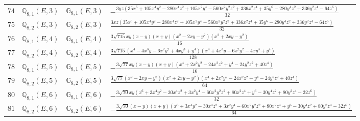\documentclass[fleqn,8pt,landscape]{jsarticle}
\begin{document}
\begin{table}[ht!]
\begin{center}
\begin{tabular}{cccl}
$ 74 $ & $ \mathbb{Q}_{8,1}(E,3) $ & $ \mathbb{G}_{8,1}(E,3) $ & $ - \frac{3 y z \left(35 x^{6} + 105 x^{4} y^{2} - 280 x^{4} z^{2} + 105 x^{2} y^{4} - 560 x^{2} y^{2} z^{2} + 336 x^{2} z^{4} + 35 y^{6} - 280 y^{4} z^{2} + 336 y^{2} z^{4} - 64 z^{6}\right)}{32} $ \\
$ 75 $ & $ \mathbb{Q}_{8,2}(E,3) $ & $ \mathbb{G}_{8,2}(E,3) $ & $ \frac{3 x z \left(35 x^{6} + 105 x^{4} y^{2} - 280 x^{4} z^{2} + 105 x^{2} y^{4} - 560 x^{2} y^{2} z^{2} + 336 x^{2} z^{4} + 35 y^{6} - 280 y^{4} z^{2} + 336 y^{2} z^{4} - 64 z^{6}\right)}{32} $ \\
$ 76 $ & $ \mathbb{Q}_{8,1}(E,4) $ & $ \mathbb{G}_{8,1}(E,4) $ & $ \frac{3 \sqrt{715} x y \left(x - y\right) \left(x + y\right) \left(x^{2} - 2 x y - y^{2}\right) \left(x^{2} + 2 x y - y^{2}\right)}{16} $ \\
$ 77 $ & $ \mathbb{Q}_{8,2}(E,4) $ & $ \mathbb{G}_{8,2}(E,4) $ & $ \frac{3 \sqrt{715} \left(x^{4} - 4 x^{3} y - 6 x^{2} y^{2} + 4 x y^{3} + y^{4}\right) \left(x^{4} + 4 x^{3} y - 6 x^{2} y^{2} - 4 x y^{3} + y^{4}\right)}{128} $ \\
$ 78 $ & $ \mathbb{Q}_{8,1}(E,5) $ & $ \mathbb{G}_{8,1}(E,5) $ & $ - \frac{3 \sqrt{77} x y \left(x - y\right) \left(x + y\right) \left(x^{4} + 2 x^{2} y^{2} - 24 x^{2} z^{2} + y^{4} - 24 y^{2} z^{2} + 40 z^{4}\right)}{16} $ \\
$ 79 $ & $ \mathbb{Q}_{8,2}(E,5) $ & $ \mathbb{G}_{8,2}(E,5) $ & $ \frac{3 \sqrt{77} \left(x^{2} - 2 x y - y^{2}\right) \left(x^{2} + 2 x y - y^{2}\right) \left(x^{4} + 2 x^{2} y^{2} - 24 x^{2} z^{2} + y^{4} - 24 y^{2} z^{2} + 40 z^{4}\right)}{64} $ \\
$ 80 $ & $ \mathbb{Q}_{8,1}(E,6) $ & $ \mathbb{G}_{8,1}(E,6) $ & $ - \frac{3 \sqrt{70} x y \left(x^{6} + 3 x^{4} y^{2} - 30 x^{4} z^{2} + 3 x^{2} y^{4} - 60 x^{2} y^{2} z^{2} + 80 x^{2} z^{4} + y^{6} - 30 y^{4} z^{2} + 80 y^{2} z^{4} - 32 z^{6}\right)}{32} $ \\
$ 81 $ & $ \mathbb{Q}_{8,2}(E,6) $ & $ \mathbb{G}_{8,2}(E,6) $ & $ - \frac{3 \sqrt{70} \left(x - y\right) \left(x + y\right) \left(x^{6} + 3 x^{4} y^{2} - 30 x^{4} z^{2} + 3 x^{2} y^{4} - 60 x^{2} y^{2} z^{2} + 80 x^{2} z^{4} + y^{6} - 30 y^{4} z^{2} + 80 y^{2} z^{4} - 32 z^{6}\right)}{64} $ \\
 \hline \hline
\end{tabular}
\end{center}
\end{table}
\end{document}
